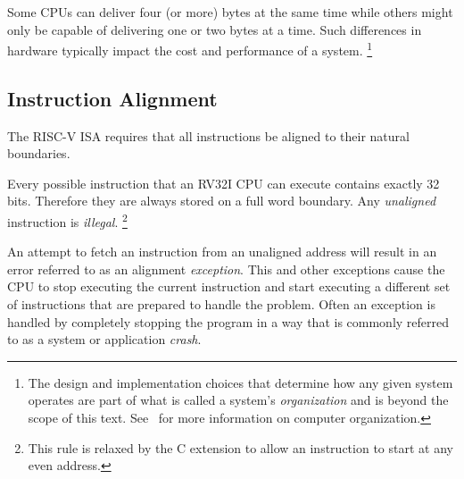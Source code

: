 Some CPUs can deliver four (or more) bytes at the same time while others 
might only be capable of delivering one or two bytes at a time.  Such 
differences in hardware typically impact the cost and performance of a 
system.%
\footnote{The design and implementation
choices that determine how any given system operates are part of what is
called a system's {\em organization} and is beyond the scope of this text.
See~\cite{codriscv:2017} for more information on computer organization.}


\subsection{Instruction Alignment}

The RISC-V ISA requires that all instructions be aligned to their
natural boundaries.

Every possible instruction that an RV32I CPU can execute contains
exactly 32 bits.  Therefore they are always stored on a full word
boundary.  Any {\em unaligned} instruction is {\em illegal}.%
\footnote{This rule is relaxed by the C extension to allow an 
instruction to start at any even address.\cite[p.~5]{rvismv1v22:2017}}

An attempt to fetch an instruction from an unaligned address
will result in an error referred to as an alignment {\em \gls{exception}}.
This and other exceptions cause the CPU to stop executing the
current instruction and start executing a different set of instructions
that are prepared to handle the problem.  Often an exception is
handled by completely stopping the program in a way that is commonly
referred to as a system or application {\em crash}.
